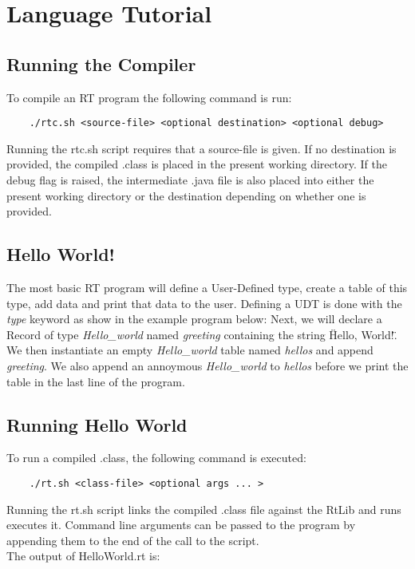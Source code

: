        
\chapter{Language Tutorial}

\section{Running the Compiler}
To compile an RT program the following command is run:
\begin{verbatim}
	./rtc.sh <source-file> <optional destination> <optional debug>
\end{verbatim}
Running the rtc.sh script requires that a source-file is given. If no destination is provided, the compiled .class
is placed in the present working directory. If the debug flag is raised, the intermediate .java file is 
also placed into either the present working directory or the destination depending on whether one 
is provided.

\section{Hello World!}
The most basic RT program will define a User-Defined type, create a table of this type, add data and 
print that data to the user. Defining a UDT is done with the \textsl{type} keyword as show in the example
program below:
Next, we will declare a Record of type \textsl{Hello\_world} named \textsl{greeting} containing the string \"Hello, World!\". 
We then instantiate an empty \textsl{Hello\_world} table named \textsl{hellos} and append \textsl{greeting}. 
We also append an annoymous \textsl{Hello\_world} to \textsl{hellos} before we print the table in the last 
line of the program.

\section{Running Hello World}

To run a compiled .class, the following command is executed:
\begin{verbatim}
	./rt.sh <class-file> <optional args ... >
\end{verbatim}
Running the rt.sh script links the compiled .class file against the RtLib and runs executes it. 
Command line arguments can be passed to the program by appending them to the end of the call
to the script. \\
The output of HelloWorld.rt is:
